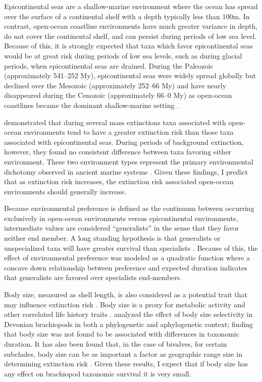 \documentclass{article}
\begin{document}
Epicontinental seas are a shallow-marine environment where the ocean has spread over the surface of a continental shelf with a depth typically less than 100m. In contrast, open-ocean coastline environments have much greater variance in depth, do not cover the continental shelf, and can persist during periods of low sea level. Because of this, it is strongly expected that taxa which favor epicontinental seas would be at great risk during periods of low sea levels, such as during glacial periods, when epicontinental seas are drained. During the Paleozoic (approximately 541--252 My), epicontinental seas were widely spread globally but declined over the Mesozoic (approximately 252--66 My) and have nearly disappeared during the Cenozoic (approximately 66--0 My) as open-ocean coastlines became the dominant shallow-marine setting \citep{Peters2008,Miller2009a,Johnson1974}. 

\citet{Miller2009a} demonstrated that during several mass extinctions taxa associated with open-ocean environments tend to have a greater extinction risk than those taxa associated with epicontinental seas. During periods of background extinction, however, they found no consistent difference between taxa favoring either environment. These two environment types represent the primary environmental dichotomy observed in ancient marine systems \citep{Miller2009a,Peters2008,Sheehan2001b}. Given these findings, I predict that as extinction risk increases, the extinction risk associated open-ocean environments should generally increase. 

Because environmental preference is defined as the continuum between occurring exclusively in open-ocean environments versus epicontinental environments, intermediate values are considered ``generalists'' in the sense that they favor neither end member. A long standing hypothesis is that generalists or unspecialized taxa will have greater survival than specialists \citep{Simpson1944,Liow2004a,Liow2007b,Nurnberg2013a,Nurnberg2015,Baumiller1993}. Because of this, the effect of environmental preference was modeled as a quadratic function where a concave down relationship between preference and expected duration indicates that generalists are favored over specialists end-members.

Body size, measured as shell length, is also considered as a potential trait that may influence extinction risk \citep{Payne2014,Harnik2011}. Body size is a proxy for metabolic activity and other correlated life history traits \citep{Payne2014}. \citet{Harnik2014} analyzed the effect of body size selectivity in Devonian brachiopods in both a phylogenetic and aphylogenetic context; finding that body size was not found to be associated with differences in taxonomic duration. It has also been found that, in the case of bivalves, for certain subclades, body size can be as important a factor as geographic range size in determining extinction risk \citep{Harnik2011}. Given these results, I expect that if body size has any effect on brachiopod taxonomic survival it is very small.
\end{document}
